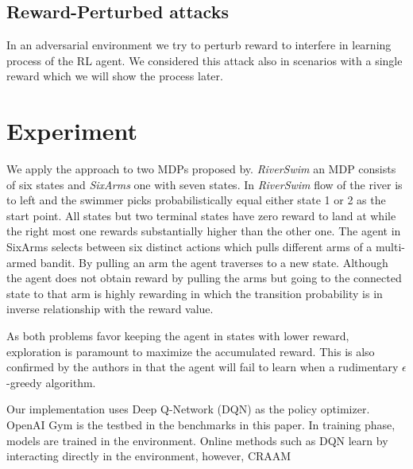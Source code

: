 \documentclass{article}
\begin{document}
    \subsection{Reward-Perturbed attacks}
    In an adversarial environment we try to perturb reward to interfere in learning process of the RL agent. We considered this attack also in scenarios with a single reward which we will show the process later.

    \section{Experiment}
    We apply the approach to two MDPs proposed by\cite{Strehl2004}. \textit{RiverSwim} an MDP consists of six states and \textit{SixArms} one with seven states. In \textit{RiverSwim} flow of the river is to left and the swimmer picks probabilistically equal either state 1 or 2 as the start point. All states but two terminal states have zero reward to land at while the right most one rewards substantially higher than the other one. The agent in SixArms selects between six distinct actions which pulls different arms of a multi-armed bandit. By pulling an arm the agent traverses to a new state. Although the agent does not obtain reward by pulling the arms but going to the connected state to that arm is highly rewarding in which the transition probability is in inverse relationship with the reward value.

    As both problems favor keeping the agent in states with lower reward, exploration is paramount to maximize the accumulated reward. This is also confirmed by the authors in \cite{Strehl2004} that the agent will fail to learn when a rudimentary $\epsilon$-greedy algorithm.

    Our implementation uses Deep Q-Network (DQN)\cite{Mnih2015} as the policy optimizer. OpenAI Gym \cite{Brockman2016} is the testbed in the benchmarks in this paper. In training phase, models are trained in the environment. Online methods such as DQN learn by interacting directly in the environment, however, CRAAM

\end{document}
